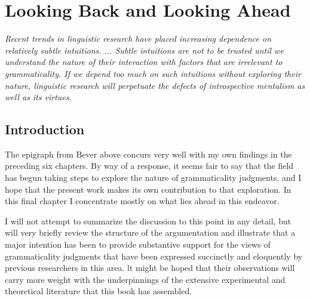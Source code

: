 \chapter{Looking Back and Looking Ahead}\label{sec:7}

 \epigraph{\itshape Recent trends in linguistic research have placed increasing dependence on relatively subtle intuitions. ... Subtle intuitions are not to be trusted until we understand the nature of their interaction with factors that are irrelevant to grammaticality. If we depend too much on such intuitions without exploring their nature, linguistic research will perpetuate the defects of introspective mentalism as well as its virtues.\\[-2\baselineskip]}{\citep{Bever1970b}}

 \section{Introduction}\label{sec:7.1}

 The epigraph from Bever above concurs very well with my own findings in the preceding six chapters. By way of a response, it seems fair to say that the field has begun taking steps to explore the nature of grammaticality judgments, and I hope that the present work makes its own contribution to that exploration. In this final chapter I concentrate mostly on what lies ahead in this endeavor.

 I will not attempt to summarize the discussion to this point in any detail, but will very briefly review the structure of the argumentation and illustrate that a major intention has been to provide substantive support for the views of grammaticality judgments that have been expressed succinctly and eloquently by previous researchers in this area. lt might be hoped that their observations will carry more weight with the underpinnings of the extensive experimental and theoretical literature that this book has assembled.

